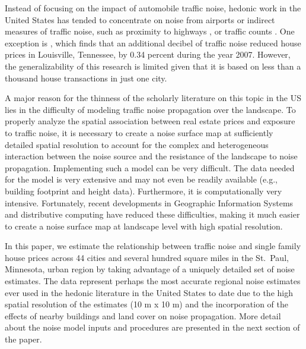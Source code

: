 \documentclass{article}\usepackage[]{graphicx}\usepackage[]{color}
\begin{document}
Instead of focusing on the impact of automobile traffic noise, hedonic work in the United States has tended to concentrate on noise from airports \citep{Espey2000, McMillen2004, Cohen2008a} or indirect measures of traffic noise, such as proximity to highways \citep{Matthews2007, Chernobai2009, Li2012}, or traffic counts \citep{HughesJr.1992, Larsen2012}. One exception is \citet{Cheng2008}, which finds that an additional decibel of traffic noise reduced house prices in Louisville, Tennessee, by 0.34 percent during the year 2007. However, the generalizability of this research is limited given that it is based on less than a thousand house transactions in just one city. 

A major reason for the thinness of the scholarly literature on this topic in the US lies in the difficulty of modeling traffic noise propagation over the landscape. To properly analyze the spatial association between real estate prices and exposure to traffic noise, it is necessary to create a noise surface map at sufficiently detailed spatial resolution to account for the complex and heterogeneous interaction between the noise source and the resistance of the landscape to noise propagation.  Implementing such a model can be very difficult.  The data needed for the model is very extensive and may not even be readily available (e.g., building footprint and height data).  Furthermore, it is computationally very intensive. Fortunately, recent developments in Geographic Information Systems and distributive computing have reduced these difficulties, making it much easier to create a noise surface map at landscape level with high spatial resolution.  

In this paper, we estimate the relationship between traffic noise and single family house prices across 44 cities and several hundred square miles in the St.\ Paul, Minnesota, urban region by taking advantage of a uniquely detailed set of noise estimates. The data represent perhaps the most accurate regional noise estimates ever used in the hedonic literature in the United States to date due to the high spatial resolution of the estimates (10 m x 10 m) and the incorporation of the effects of nearby buildings and land cover on noise propagation. More detail about the noise model inputs and procedures are presented in the next section of the paper. 
 
\end{document}
